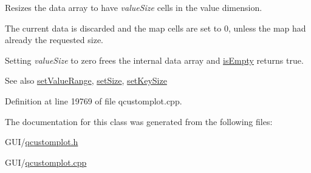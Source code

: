 Resizes the data array to have {\itshape value\+Size} cells in the value dimension.

The current data is discarded and the map cells are set to 0, unless the map had already the requested size.

Setting {\itshape value\+Size} to zero frees the internal data array and \hyperlink{class_q_c_p_color_map_data_aea88cc75a76ca571acf29b2ba8ac970d}{is\+Empty} returns true.

\begin{DoxySeeAlso}{See also}
\hyperlink{class_q_c_p_color_map_data_ada1b2680ba96a5f4175b6d341cf75d23}{set\+Value\+Range}, \hyperlink{class_q_c_p_color_map_data_a0d9ff35c299d0478b682bfbcdd9c097e}{set\+Size}, \hyperlink{class_q_c_p_color_map_data_ac7ef70e383aface34b44dbde49234b6b}{set\+Key\+Size} 
\end{DoxySeeAlso}


Definition at line 19769 of file qcustomplot.\+cpp.



The documentation for this class was generated from the following files\+:\begin{DoxyCompactItemize}
\item 
G\+U\+I/\hyperlink{qcustomplot_8h}{qcustomplot.\+h}\item 
G\+U\+I/\hyperlink{qcustomplot_8cpp}{qcustomplot.\+cpp}\end{DoxyCompactItemize}
